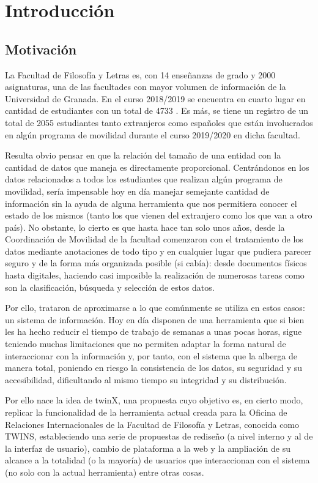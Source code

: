 \section{Introducción}
\subsection{Motivación}

La Facultad de Filosofía y Letras es, con 14 enseñanzas de grado y 2000 asignaturas, una de las facultades con mayor volumen de información de la Universidad de Granada. En el curso 2018/2019 se encuentra en cuarto lugar en cantidad de estudiantes con un total de 4733 \cite{MemAcademica}. Es más, se tiene un registro de un total de 2055 estudiantes tanto extranjeros como españoles que están involucrados en algún programa de movilidad durante el curso 2019/2020 en dicha facultad.

Resulta obvio pensar en que la relación del tamaño de una entidad con la cantidad de datos que maneja es directamente proporcional. Centrándonos en los datos relacionados a todos los estudiantes que realizan algún programa de movilidad, sería impensable hoy en día manejar semejante cantidad de información sin la ayuda de alguna herramienta que nos permitiera conocer el estado de los mismos (tanto los que vienen del extranjero como los que van a otro país). No obstante, lo cierto es que hasta hace tan solo unos años, desde la Coordinación de Movilidad de la facultad comenzaron con el tratamiento de los datos mediante anotaciones de todo tipo y en cualquier lugar que pudiera parecer seguro y de la forma más organizada posible (si cabía): desde documentos físicos hasta digitales, haciendo casi imposible la realización de numerosas tareas como son la clasificación, búsqueda y selección de estos datos.

Por ello, trataron de aproximarse a lo que comúnmente se utiliza en estos casos: un sistema de información. Hoy en día disponen de una herramienta que si bien les ha hecho reducir el tiempo de trabajo de semanas a unas pocas horas, sigue teniendo muchas limitaciones que no permiten adaptar la forma natural de interaccionar con la información y, por tanto, con el sistema que la alberga de manera total, poniendo en riesgo la consistencia de los datos, su seguridad y su accesibilidad, dificultando al mismo tiempo su integridad y su distribución.

Por ello nace la idea de twinX, una propuesta cuyo objetivo es, en cierto modo, replicar la funcionalidad de la herramienta actual creada para la Oficina de Relaciones Internacionales de la Facultad de Filosofía y Letras, conocida como TWINS, estableciendo una serie de propuestas de rediseño (a nivel interno y al de la interfaz de usuario), cambio de plataforma a la web y la ampliación de su alcance a la totalidad (o la mayoría) de usuarios que interaccionan con el sistema (no solo con la actual herramienta) entre otras cosas.

